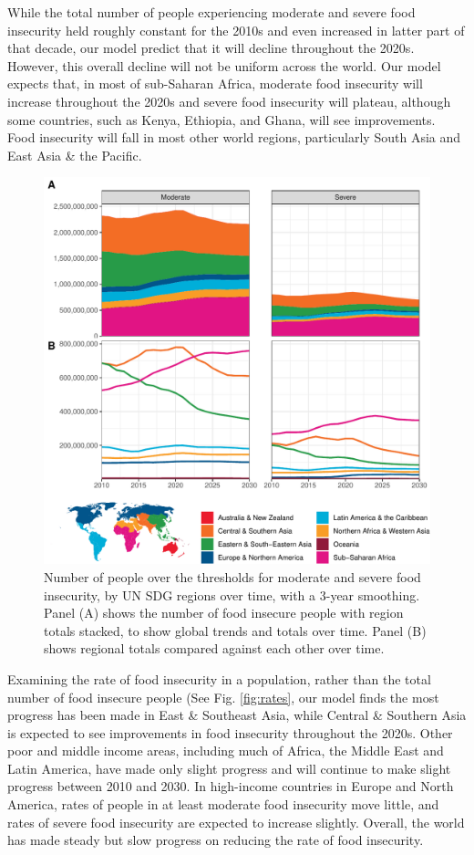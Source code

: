 \documentclass{article}
\begin{document}
While the total number of people experiencing moderate and severe food insecurity held roughly constant for the 2010s and even increased in latter part of that decade, our model predict that it will decline throughout the 2020s. However, this overall decline will not be uniform across the world. Our model expects that, in most of sub-Saharan Africa, moderate food insecurity will increase throughout the 2020s and severe food insecurity will plateau, although some countries, such as Kenya, Ethiopia, and Ghana, will see improvements. Food insecurity will fall in most other world regions, particularly South Asia and East Asia \& the Pacific.

\begin{figure}[H]
  \centering
  \includegraphics[width=\linewidth]{img/TimeSeries.pdf}
  \caption{Number of people over the thresholds for moderate and severe food insecurity, by UN SDG regions over time, with a 3-year smoothing.  Panel (A) shows the number of food insecure people with region totals stacked, to show global trends and totals over time.  Panel (B) shows regional totals compared against each other over time.}
  \label{fig:timeseries}
\end{figure}

Examining the rate of food insecurity in a population, rather than the total number of food insecure people (See Fig. \ref{fig:rates}, our model finds the most progress has been made in East \& Southeast Asia, while Central \& Southern Asia is expected to see improvements in food insecurity throughout the 2020s.  Other poor and middle income areas, including much of Africa, the Middle East and Latin America, have made only slight progress and will continue to make slight progress between 2010 and 2030.  In high-income countries in Europe and North America, rates of people in at least moderate food insecurity move little, and rates of severe food insecurity are expected to increase slightly.  Overall, the world has made steady but slow progress on reducing the rate of food insecurity.
\end{document}
